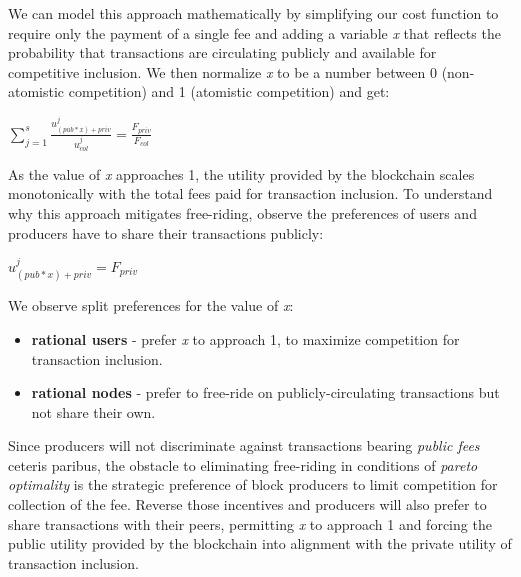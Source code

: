 \documentclass[oneside]{article}   	%
\begin{document}
We can model this approach mathematically by simplifying our cost function to require only the payment of a single fee and adding a variable \textit{x} that reflects the probability that transactions are circulating publicly and available for competitive inclusion. We then normalize \textit{x} to be a number between 0 (non-atomistic competition) and 1 (atomistic competition) and get:

\LARGE
\begin{adjustwidth}{1.5em}{1.5em}
\begin{math}
\sum_{j=1}^{s} \frac{u_{({pub}*{x})+{priv}}^j}{u_{col}^j} = \frac{F_{{priv}}}{F_{col}}
\end{math}
\end{adjustwidth}
\normalsize

As the value of \textit{x} approaches 1, the utility provided by the blockchain scales monotonically with the total fees paid for transaction inclusion. To understand why this approach mitigates free-riding, observe the preferences of users and producers have to share their transactions publicly:

\LARGE
\begin{adjustwidth}{1.5em}{1.5em}
\begin{math}
u_{\left({pub}*{x}\right)+{priv}}^j = F_{priv}
\end{math}
\end{adjustwidth}
\normalsize

We observe split preferences for the value of \textit{x}:

\begin{itemize}
  \item \textbf{rational users} - prefer \textit{x} to approach 1, to maximize competition for transaction inclusion.
  \item \textbf{rational nodes} - prefer to free-ride on publicly-circulating transactions but not share their own.
\end{itemize}

Since producers will not discriminate against transactions bearing \textit{public fees} ceteris paribus, the obstacle to eliminating free-riding in conditions of \textit{pareto optimality} is the strategic preference of block producers to limit competition for collection of the fee. Reverse those incentives and producers will also prefer to share transactions with their peers, permitting \textit{x} to approach 1 and forcing the public utility provided by the blockchain into alignment with the private utility of transaction inclusion.
\end{document}
